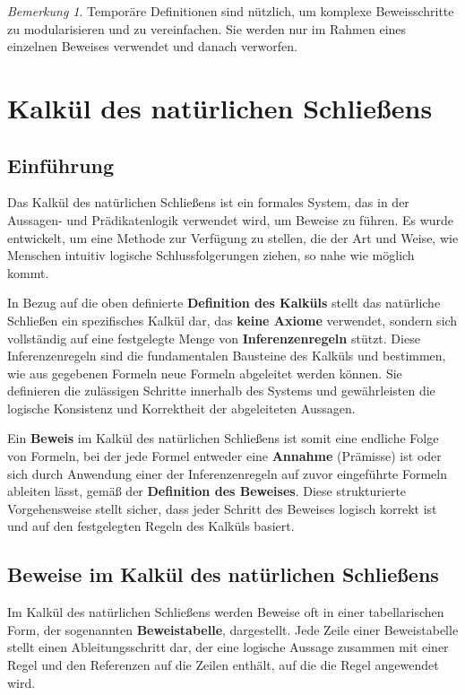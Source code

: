 \documentclass{book}
\theoremstyle{plain}
\theoremstyle{remark}
\newtheorem*{remark}{Bemerkung}
\theoremstyle{definition}
\begin{document}
\begin{remark}
Temporäre Definitionen sind nützlich, um komplexe Beweisschritte zu modularisieren und zu vereinfachen. Sie werden nur im Rahmen eines einzelnen Beweises verwendet und danach verworfen.
\end{remark}

\section{Kalkül des natürlichen Schließens}

\subsection{Einführung}
Das Kalkül des natürlichen Schließens ist ein formales System, das in der Aussagen- und Prädikatenlogik verwendet wird, um Beweise zu führen. Es wurde entwickelt, um eine Methode zur Verfügung zu stellen, die der Art und Weise, wie Menschen intuitiv logische Schlussfolgerungen ziehen, so nahe wie möglich kommt.

In Bezug auf die oben definierte \textbf{Definition des Kalküls} stellt das natürliche Schließen ein spezifisches Kalkül dar, das \textbf{keine Axiome} verwendet, sondern sich vollständig auf eine festgelegte Menge von \textbf{Inferenzenregeln} stützt. Diese Inferenzenregeln sind die fundamentalen Bausteine des Kalküls und bestimmen, wie aus gegebenen Formeln neue Formeln abgeleitet werden können. Sie definieren die zulässigen Schritte innerhalb des Systems und gewährleisten die logische Konsistenz und Korrektheit der abgeleiteten Aussagen.

Ein \textbf{Beweis} im Kalkül des natürlichen Schließens ist somit eine endliche Folge von Formeln, bei der jede Formel entweder eine \textbf{Annahme} (Prämisse) ist oder sich durch Anwendung einer der Inferenzenregeln auf zuvor eingeführte Formeln ableiten lässt, gemäß der \textbf{Definition des Beweises}. Diese strukturierte Vorgehensweise stellt sicher, dass jeder Schritt des Beweises logisch korrekt ist und auf den festgelegten Regeln des Kalküls basiert.

\subsection{Beweise im Kalkül des natürlichen Schließens}

Im Kalkül des natürlichen Schließens werden Beweise oft in einer tabellarischen Form, der sogenannten \textbf{Beweistabelle}, dargestellt. Jede Zeile einer Beweistabelle stellt einen Ableitungsschritt dar, der eine logische Aussage zusammen mit einer Regel und den Referenzen auf die Zeilen enthält, auf die die Regel angewendet wird.
\end{document}
